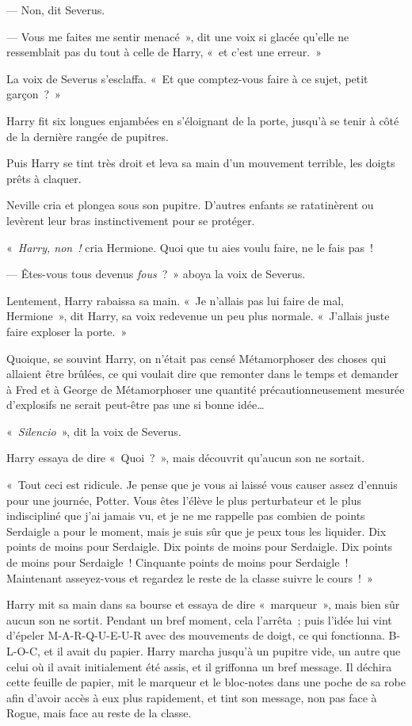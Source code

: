 --- Non, dit Severus.

--- Vous me faites me sentir menacé~», dit une voix si glacée qu'elle ne ressemblait pas du tout à celle de Harry, «~et c'est une erreur.~»

La voix de Severus s'esclaffa. «~Et que comptez-vous faire à ce sujet, petit garçon~?~»

Harry fit six longues enjambées en s'éloignant de la porte, jusqu'à se tenir à côté de la dernière rangée de pupitres.

Puis Harry se tint très droit et leva sa main d'un mouvement terrible, les doigts prêts à claquer.

Neville cria et plongea sous son pupitre. D'autres enfants se ratatinèrent ou levèrent leur bras instinctivement pour se protéger.

«~\emph{Harry, non~!} cria Hermione. Quoi que tu aies voulu faire, ne le fais pas~!

--- Êtes-vous tous devenus \emph{fous}~?~» aboya la voix de Severus.

Lentement, Harry rabaissa sa main. «~Je n'allais pas lui faire de mal, Hermione~», dit Harry, sa voix redevenue un peu plus normale. «~J'allais juste faire exploser la porte.~»

Quoique, se souvint Harry, on n'était pas censé Métamorphoser des choses qui allaient être brûlées, ce qui voulait dire que remonter dans le temps et demander à Fred et à George de Métamorphoser une quantité précautionneusement mesurée d'explosifs ne serait peut-être pas une si bonne idée…

«~\emph{Silencio}~», dit la voix de Severus.

Harry essaya de dire «~Quoi~?~», mais découvrit qu'aucun son ne sortait.

«~Tout ceci est ridicule. Je pense que je vous ai laissé vous causer assez d'ennuis pour une journée, Potter. Vous êtes l'élève le plus perturbateur et le plus indiscipliné que j'ai jamais vu, et je ne me rappelle pas combien de points Serdaigle a pour le moment, mais je suis sûr que je peux tous les liquider. Dix points de moins pour Serdaigle. Dix points de moins pour Serdaigle. Dix points de moins pour Serdaigle~! Cinquante points de moins pour Serdaigle~! Maintenant asseyez-vous et regardez le reste de la classe suivre le cours~!~»

Harry mit sa main dans sa bourse et essaya de dire «~marqueur~», mais bien sûr aucun son ne sortit. Pendant un bref moment, cela l'arrêta~; puis l'idée lui vint d'épeler M-A-R-Q-U-E-U-R avec des mouvements de doigt, ce qui fonctionna. B-L-O-C, et il avait du papier. Harry marcha jusqu'à un pupitre vide, un autre que celui où il avait initialement été assis, et il griffonna un bref message. Il déchira cette feuille de papier, mit le marqueur et le bloc-notes dans une poche de sa robe afin d'avoir accès à eux plus rapidement, et tint son message, non pas face à Rogue, mais face au reste de la classe.

